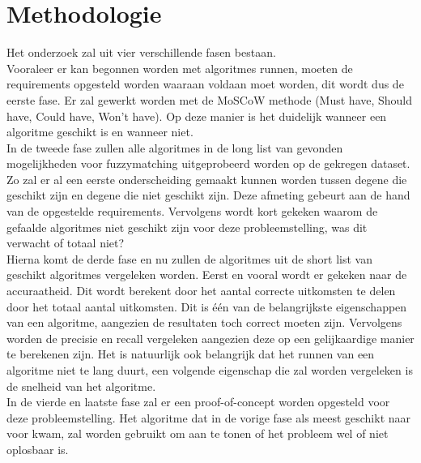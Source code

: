 

\section{Methodologie}%
\label{sec:methodologie}

Het onderzoek zal uit vier verschillende fasen bestaan.
\\\indent
Vooraleer er kan begonnen worden met algoritmes runnen, moeten de requirements opgesteld worden waaraan voldaan moet worden, dit wordt dus de eerste fase. Er zal gewerkt worden met de MoSCoW methode (Must have, Should have, Could have, Won't have). Op deze manier is het duidelijk wanneer een algoritme geschikt is en wanneer niet.
\\\indent
In de tweede fase zullen alle algoritmes in de long list van gevonden mogelijkheden voor fuzzymatching uitgeprobeerd worden op de gekregen dataset. Zo zal er al een eerste onderscheiding gemaakt kunnen worden tussen degene die geschikt zijn en degene die niet geschikt zijn. Deze afmeting gebeurt aan de hand van de opgestelde requirements. Vervolgens wordt kort gekeken waarom de gefaalde algoritmes niet geschikt zijn voor deze probleemstelling, was dit verwacht of totaal niet?
\\\indent
Hierna komt de derde fase en nu zullen de algoritmes uit de short list van geschikt algoritmes vergeleken worden. Eerst en vooral wordt er gekeken naar de accuraatheid. Dit wordt berekent door het aantal correcte uitkomsten te delen door het totaal aantal uitkomsten. Dit is één van de belangrijkste eigenschappen van een algoritme, aangezien de resultaten toch correct moeten zijn. Vervolgens worden de precisie en recall vergeleken aangezien deze op een gelijkaardige manier te berekenen zijn. Het is natuurlijk ook belangrijk dat het runnen van een algoritme niet te lang duurt, een volgende eigenschap die zal worden vergeleken is de snelheid van het algoritme.
\\\indent
In de vierde en laatste fase zal er een proof-of-concept worden opgesteld voor deze probleemstelling. Het algoritme dat in de vorige fase als meest geschikt naar voor kwam, zal worden gebruikt om aan te tonen of het probleem wel of niet oplosbaar is.






